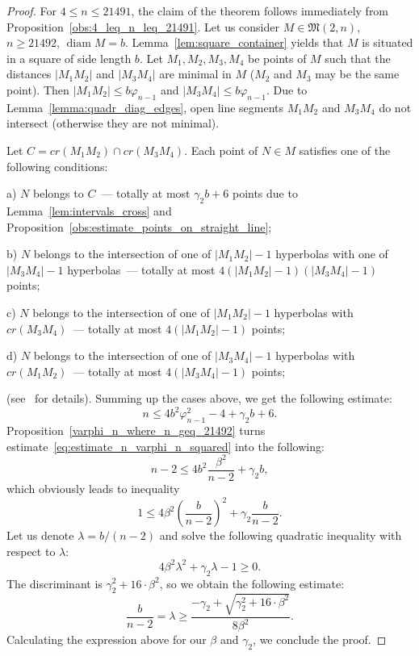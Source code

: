 \documentclass[a4paper,14pt]{article} %
\theoremstyle{plain}
\theoremstyle{definition}
\begin{document}
\begin{proof}
	For $4 \leq n \leq 21491$, the claim of the theorem follows immediately from Proposition~\ref{obs:4_leq_n_leq_21491}.
	Let us consider $M\in \mathfrak{M}(2,n)$, $n \geq 21492$, $\operatorname{diam} M = b$.
	Lemma~\ref{lem:square_container} yields that $M$ is situated in a square of side length $b$.
	Let $M_1, M_2, M_3, M_4$ be points of $M$ such that the distances $|M_1 M_2|$ and $|M_3 M_4|$
	are minimal in $M$ ($M_2$ and $M_3$ may be the same point).
	Then $|M_1 M_2| \leq b\varphi_{n-1}$ and $|M_3 M_4| \leq b\varphi_{n-1}$.
	Due to Lemma~\ref{lemma:quadr_diag_edges}, open line segments $M_1 M_2$ and $M_3 M_4$ do not intersect
	(otherwise they are not minimal).

	Let $C = cr(M_1 M_2) \cap cr(M_3 M_4)$.
	Each point of $N\in M$ satisfies one of the following conditions:

	a) $N$ belongs to $C$~--- totally at most $\gamma_2 b + 6$ points due to Lemma~\ref{lem:intervals_cross} and Proposition~\ref{obs:estimate_points_on_straight_line};

	b) $N$ belongs to the intersection of one of $|M_1 M_2| - 1$ hyperbolas
	with one of $|M_3 M_4| - 1$ hyperbolas~--- totally at most $4 (|M_1 M_2| - 1)(|M_3 M_4| - 1)$ points;

	c) $N$ belongs to the intersection of one of $|M_1 M_2| - 1$ hyperbolas with $cr(M_3 M_4)$~---
	totally at most $4 (|M_1 M_2| - 1)$ points;

	d) $N$ belongs to the intersection of one of $|M_3 M_4| - 1$ hyperbolas with $cr(M_1 M_2)$~---
	totally at most $4 (|M_3 M_4| - 1)$ points;

	(see~\cite{erdos1945integral} for details).
	Summing up the cases above, we get the following estimate:
	\begin{equation}
		\label{eq:estimate_n_varphi_n_squared}
		n \leq 4 b^2 \varphi_{n-1}^2 - 4 + \gamma_2 b + 6
		.
	\end{equation}
	Proposition~\ref{varphi_n_where_n_geq_21492} turns estimate~\eqref{eq:estimate_n_varphi_n_squared}
	into the following:
	\begin{equation}
		\label{eq:estimate_n_sqrt_n-2}
		n-2 \leq 4 b^2 \frac{\beta^2}{n-2} + \gamma_2 b
		,
	\end{equation}
	which obviously leads to inequality
	\begin{equation}
		1 \leq 4\beta^2 \left(\frac{b}{n-2}\right)^2  + \gamma_2 \frac{b}{n-2}
		.
	\end{equation}
	Let us denote $\lambda = b/(n-2)$ and solve the following quadratic inequality with respect to $\lambda$:
	\begin{equation}
		\label{eq:square_inequality_lambda}
		4\beta^2 \lambda^2  + \gamma_2 \lambda - 1 \geq 0
		.
	\end{equation}
	The discriminant is $\gamma_2^2 + 16 \cdot \beta^2$,
	so we obtain the following estimate:
	\begin{equation}
		\frac{b}{n-2} = \lambda \geq \frac{-\gamma_2 + \sqrt{\gamma_2^2 + 16 \cdot \beta^2}}{8\beta^2}
		.
	\end{equation}
	Calculating the expression above for our $\beta$ and $\gamma_2$, we conclude the proof.
\end{proof}
\end{document}
